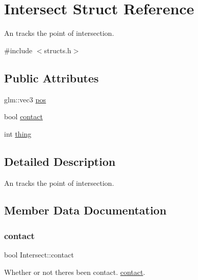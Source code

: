 \hypertarget{struct_intersect}{}\section{Intersect Struct Reference}
\label{struct_intersect}


An tracks the point of intersection.  




{\ttfamily \#include $<$structs.\+h$>$}

\subsection*{Public Attributes}
\begin{DoxyCompactItemize}
\item 
glm\+::vec3 \mbox{\hyperlink{struct_intersect_acac3d72036e36079b68fdfecf071785c}{pos}}
\item 
bool \mbox{\hyperlink{struct_intersect_a804dc874077e6140a02aeddcfa992892}{contact}}
\item 
int \mbox{\hyperlink{struct_intersect_a0db00f51f704942fd24de64379a74c28}{thing}}
\end{DoxyCompactItemize}


\subsection{Detailed Description}
An tracks the point of intersection. 

\subsection{Member Data Documentation}
\mbox{\label{struct_intersect_a804dc874077e6140a02aeddcfa992892}} 
\subsubsection{\texorpdfstring{contact}{contact}}
{\footnotesize\ttfamily bool Intersect\+::contact}

Whether or not there\textquotesingle{}s been contact. \mbox{\hyperlink{struct_intersect_a804dc874077e6140a02aeddcfa992892}{contact}}. \mbox{\label{struct_intersect_acac3d72036e36079b68fdfecf071785c}} 
